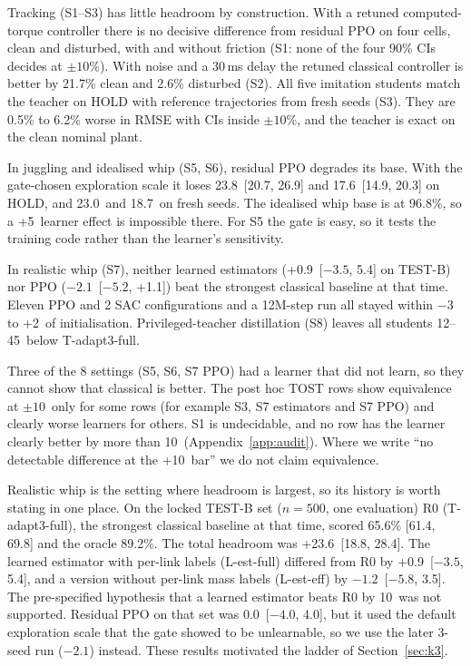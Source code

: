 Tracking (S1--S3) has little headroom by construction. With a retuned computed-torque controller there is no decisive difference from residual PPO on four cells, clean and disturbed, with and without friction (S1: none of the four 90\% CIs decides at $\pm10\%$). With noise and a 30\,ms delay the retuned classical controller is better by 21.7\% clean and 2.6\% disturbed (S2). All five imitation students match the teacher on HOLD with reference trajectories from fresh seeds (S3). They are 0.5\% to 6.2\% worse in RMSE with CIs inside $\pm10\%$, and the teacher is exact on the clean nominal plant.

In juggling and idealised whip (S5, S6), residual PPO degrades its base. With the gate-chosen exploration scale it loses 23.8\pp\ [20.7, 26.9] and 17.6\pp\ [14.9, 20.3] on HOLD, and 23.0\pp\ and 18.7\pp\ on fresh seeds. The idealised whip base is at 96.8\%, so a +5\pp\ learner effect is impossible there. For S5 the gate is easy, so it tests the training code rather than the learner's sensitivity.

In realistic whip (S7), neither learned estimators (+0.9\pp\ [$-3.5$, 5.4] on TEST-B) nor PPO ($-2.1$\pp\ [$-5.2$, +1.1]) beat the strongest classical baseline at that time. Eleven PPO and 2 SAC configurations and a 12M-step run all stayed within $-3$ to +2\pp\ of initialisation. Privileged-teacher distillation (S8) leaves all students 12--45\pp\ below T-adapt3-full.

Three of the 8 settings (S5, S6, S7 PPO) had a learner that did not learn, so they cannot show that classical is better. The post hoc TOST rows show equivalence at $\pm10$\pp\ only for some rows (for example S3, S7 estimators and S7 PPO) and clearly worse learners for others. S1 is undecidable, and no row has the learner clearly better by more than 10\pp\ (Appendix~\ref{app:audit}). Where we write ``no detectable difference at the +10\pp\ bar'' we do not claim equivalence.

Realistic whip is the setting where headroom is largest, so its history is worth stating in one place. On the locked TEST-B set ($n{=}500$, one evaluation) R0 (T-adapt3-full), the strongest classical baseline at that time, scored 65.6\% [61.4, 69.8] and the oracle 89.2\%. The total headroom was +23.6\pp\ [18.8, 28.4]. The learned estimator with per-link labels (L-est-full) differed from R0 by +0.9\pp\ [$-3.5$, 5.4], and a version without per-link mass labels (L-est-eff) by $-1.2$\pp\ [$-5.8$, 3.5]. The pre-specified hypothesis that a learned estimator beats R0 by 10\pp\ was not supported. Residual PPO on that set was 0.0\pp\ [$-4.0$, 4.0], but it used the default exploration scale that the gate showed to be unlearnable, so we use the later 3-seed run ($-2.1$\pp) instead. These results motivated the ladder of Section~\ref{sec:k3}.

